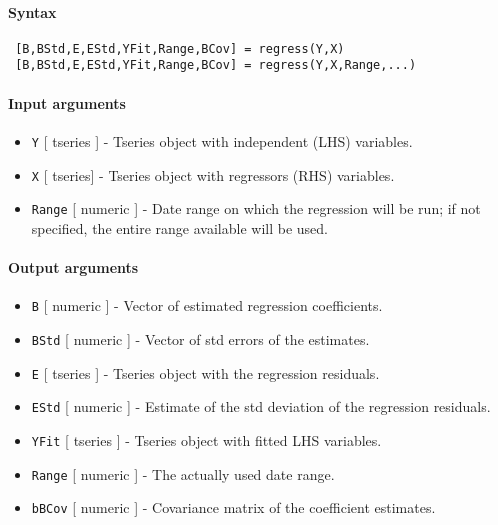 


	\paragraph{Syntax}
 
 \begin{verbatim}
 [B,BStd,E,EStd,YFit,Range,BCov] = regress(Y,X)
 [B,BStd,E,EStd,YFit,Range,BCov] = regress(Y,X,Range,...)
 \end{verbatim}
 
 \paragraph{Input arguments}
 
 \begin{itemize}
 \item
   \texttt{Y} {[} tseries {]} - Tseries object with independent (LHS)
   variables.
 \item
   \texttt{X} {[} tseries{]} - Tseries object with regressors (RHS)
   variables.
 \item
   \texttt{Range} {[} numeric {]} - Date range on which the regression
   will be run; if not specified, the entire range available will be
   used.
 \end{itemize}
 
 \paragraph{Output arguments}
 
 \begin{itemize}
 \item
   \texttt{B} {[} numeric {]} - Vector of estimated regression
   coefficients.
 \item
   \texttt{BStd} {[} numeric {]} - Vector of std errors of the estimates.
 \item
   \texttt{E} {[} tseries {]} - Tseries object with the regression
   residuals.
 \item
   \texttt{EStd} {[} numeric {]} - Estimate of the std deviation of the
   regression residuals.
 \item
   \texttt{YFit} {[} tseries {]} - Tseries object with fitted LHS
   variables.
 \item
   \texttt{Range} {[} numeric {]} - The actually used date range.
 \item
   \texttt{bBCov} {[} numeric {]} - Covariance matrix of the coefficient
   estimates.
 \end{itemize}
 
